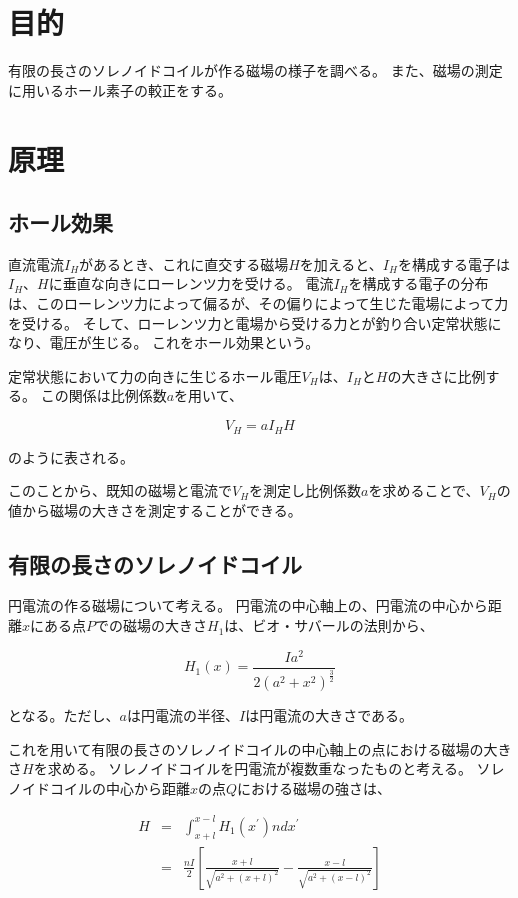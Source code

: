\documentclass[uplatex,11pt]{jsarticle}
\begin{document}
\section{目的}

有限の長さのソレノイドコイルが作る磁場の様子を調べる。
また、磁場の測定に用いるホール素子の較正をする。

\section{原理}

\subsection{ホール効果}

直流電流$I_H$があるとき、これに直交する磁場$H$を加えると、$I_H$を構成する電子は$I_H$、$H$に垂直な向きにローレンツ力を受ける。
電流$I_H$を構成する電子の分布は、このローレンツ力によって偏るが、その偏りによって生じた電場によって力を受ける。
そして、ローレンツ力と電場から受ける力とが釣り合い定常状態になり、電圧が生じる。
これをホール効果という。

定常状態において力の向きに生じるホール電圧$V_H$は、$I_H$と$H$の大きさに比例する。
この関係は比例係数$a$を用いて、

\[
    V_H = a I_H H
\]

のように表される。

このことから、既知の磁場と電流で$V_H$を測定し比例係数$a$を求めることで、$V_H$の値から磁場の大きさを測定することができる。

\subsection{有限の長さのソレノイドコイル}

円電流の作る磁場について考える。
円電流の中心軸上の、円電流の中心から距離$x$にある点$P$での磁場の大きさ$H_1$は、ビオ・サバールの法則から、

\[
    H_1(x) = \frac{Ia^2}{2(a^2+x^2)^\frac{3}{2}}
\]

となる。ただし、$a$は円電流の半径、$I$は円電流の大きさである。

これを用いて有限の長さのソレノイドコイルの中心軸上の点における磁場の大きさ$H$を求める。
ソレノイドコイルを円電流が複数重なったものと考える。
ソレノイドコイルの中心から距離$x$の点$Q$における磁場の強さは、

\begin{eqnarray}
    H & = & \int_{x + l}^{x - l} H_1(x^{\prime}) ndx^{\prime} \\
      & = & \frac{nI}{2} \left[ \frac{x + l}{\sqrt{a^2+(x+l)^2}} - \frac{x - l}{\sqrt{a^2+(x-l)^2}} \right]
\end{eqnarray}
\end{document}
